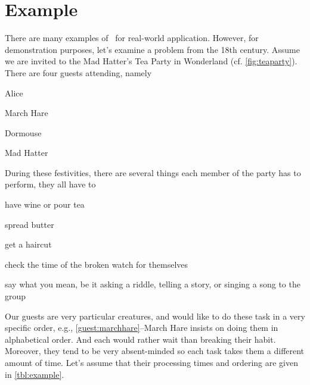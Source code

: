 \section{Example}\label{sec:jsp:example}
There are many examples of \jsp\ for real-world application. 
However, for demonstration purposes, let's examine a problem from the 18th 
century. Assume we are invited to the Mad Hatter's Tea Party in Wonderland (cf. 
\cref{fig:teaparty}). 
There are four guests attending, namely
\begin{enumerate*}[label={$J_\arabic*$)}, ref={{$J_\arabic*$}}, 
    itemjoin*={{, and our host }}]
    \item Alice\label{guest:alice}
    \item March Hare\label{guest:marchhare}
    \item Dormouse\label{guest:dormouse}
    \item Mad Hatter\label{guest:madhatter}
\end{enumerate*}
During these festivities, there are several things each member of the party has 
to perform, they all have to
\begin{enumerate*}[label={$M_\arabic*$)}]
    \item have wine or pour tea
    \item spread butter
    \item get a haircut
    \item check the time of the broken watch for themselves
    \item say what you mean, be it asking a riddle, telling a story, or singing 
    a song to the group
\end{enumerate*}
Our guests are very particular creatures, and would like to do these task in a 
very specific order, e.g., \ref{guest:marchhare}--March Hare insists on doing 
them in alphabetical order. And each would rather wait than breaking their 
habit.
Moreover, they tend to be very absent-minded so each task takes them a 
different amount of time. 
Let's assume that their processing times and ordering are given in 
\cref{tbl:example}.

